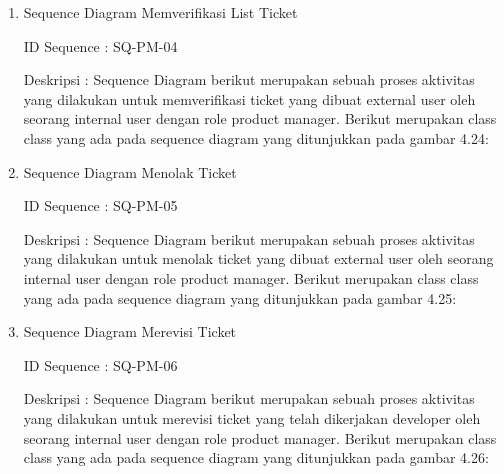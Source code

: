 \documentclass[12pt]{article}
\begin{document}
\begin{enumerate}[label=\textbf{4.\arabic*.}]
\begin{enumerate} [label=\textbf{4.2.\arabic*.}, wide, labelwidth=!, labelindent=0pt]
\begin{enumerate}[label=\textbf{4.2.2.\arabic*.}, wide, labelwidth=!, labelindent=0pt]
\begin{enumerate}[label=\arabic*.]
                \item Sequence Diagram Memverifikasi List Ticket
                
                \noindent ID Sequence	: SQ-PM-04
                
                \noindent Deskripsi	: Sequence Diagram berikut merupakan sebuah proses aktivitas yang dilakukan untuk memverifikasi ticket yang dibuat external user oleh seorang internal user dengan role product manager. Berikut merupakan class class yang ada pada sequence diagram yang ditunjukkan pada gambar 4.24:
                
                
                \item Sequence Diagram Menolak Ticket
                
                \noindent ID Sequence	: SQ-PM-05
                
                \noindent Deskripsi	: Sequence Diagram berikut merupakan sebuah proses aktivitas yang dilakukan untuk menolak ticket yang dibuat external user oleh seorang internal user dengan role product manager. Berikut merupakan class class yang ada pada sequence diagram yang ditunjukkan pada gambar 4.25:
                

                \item Sequence Diagram Merevisi Ticket
                
                \noindent ID Sequence	: SQ-PM-06
                
                \noindent Deskripsi	: Sequence Diagram berikut merupakan sebuah proses aktivitas yang dilakukan untuk merevisi ticket yang telah dikerjakan developer oleh seorang internal user dengan role product manager. Berikut merupakan class class yang ada pada sequence diagram yang ditunjukkan pada gambar 4.26:
                

\end{enumerate}
\end{enumerate}
\end{enumerate}
\end{enumerate}
\end{document}
